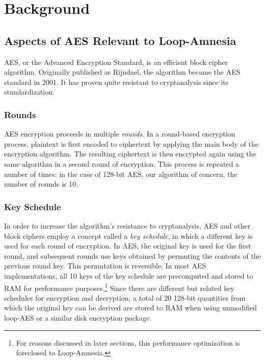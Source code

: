 \documentclass[letterpaper,twocolumn,nonatbib,10pt]{article}
\begin{document}
\section{Background}

\subsection{Aspects of AES Relevant to Loop-Amnesia}

AES, or the Advanced Encryption Standard, is an efficient block cipher
algorithm.  Originally published as Rijndael\cite{rijndael}, the
algorithm became the AES standard in 2001.  It has proven quite
resistant to
cryptanalysis\cite{cryptoeprint:2009:317}\cite{cryptoeprint:2009:531}
since its standardization.

\subsubsection{Rounds}

AES encryption proceeds in multiple \emph{rounds}.  In a round-based
encryption process, plaintext is first encoded to ciphertext by
applying the main body of the encryption algorithm.  The resulting
ciphertext is then encrypted again using the same algorithm in a
second round of encryption.  This process is repeated a number of
times: in the case of 128-bit AES, our algorithm of concern, the
number of rounds is 10.

\subsubsection{Key Schedule}

In order to increase the algorithm's resistance to cryptanalysis, AES
and other block ciphers employ a concept called a \emph{key schedule},
in which a different key is used for each round of encryption.  In
AES, the original key is used for the first round, and subsequent
rounds use keys obtained by permuting the contents of the previous
round key.  This permutation is reversible.  In most AES
implementations, all 10 keys of the key schedule are precomputed and
stored to RAM for performance purposes.\footnote{For reasons discussed
  in later sections, this performance optimization is foreclosed to
  Loop-Amnesia.}  Since there are different but related key schedules
for encryption and decryption, a total of 20 128-bit quantities from
which the original key can be derived are stored to RAM when using
unmodified loop-AES or a similar disk encryption package.
\end{document}
